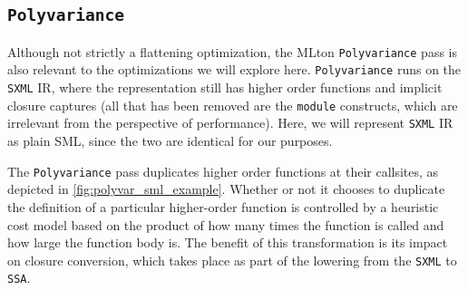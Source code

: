 


\subsection{\texttt{Polyvariance}}
\label{sec:background_polyvar}

Although not strictly a flattening optimization, the MLton \texttt{Polyvariance}
pass is also relevant to the optimizations we will explore here.
\texttt{Polyvariance} runs on the \texttt{SXML} IR, where the representation
still has higher order functions and implicit closure captures (all that has
been removed are the \texttt{module} constructs, which are irrelevant from the
perspective of performance). Here, we will represent \texttt{SXML} IR as plain
SML, since the two are identical for our purposes.

The \texttt{Polyvariance} pass duplicates higher order functions at their
callsites, as depicted in \cref{fig:polyvar_sml_example}. Whether or not it
chooses to duplicate the definition of a particular higher-order function is
controlled by a heuristic cost model based on the product of how many times the
function is called and how large the function body is. The benefit of this
transformation is its impact on closure conversion, which takes place as part of
the lowering from the \texttt{SXML} to \texttt{SSA}.



